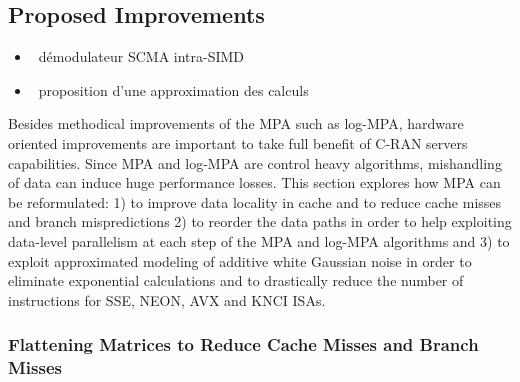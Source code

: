 \subsection{Proposed Improvements}
\label{sec:scma_improvements}

\begin{itemize}
  \item \cmark~démodulateur SCMA intra-SIMD
  \item \cmark~proposition d'une approximation des calculs
\end{itemize}

Besides methodical improvements of the MPA such as log-MPA, hardware oriented
improvements are important to take full benefit of C-RAN servers capabilities.
Since MPA and log-MPA are control heavy algorithms, mishandling of data can
induce huge performance losses. This section explores how MPA can be
reformulated: 1) to improve data locality in cache and to reduce cache misses
and branch mispredictions 2) to reorder the data paths in order to help
exploiting data-level parallelism at each step of the MPA and log-MPA algorithms
and 3) to exploit approximated modeling of additive white Gaussian noise in
order to eliminate exponential calculations and to drastically reduce the number
of instructions for SSE, NEON, AVX and KNCI ISAs.

\subsubsection{Flattening Matrices to Reduce Cache Misses and Branch Misses}
\label{sec:scma_improvements_flattening}

